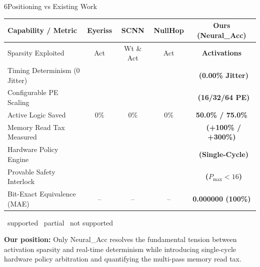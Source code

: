 \documentclass{article}
\newcommand{\bodysize}{\fontsize{20}{27}\selectfont}
\newcommand{\smallsize}{\fontsize{16}{21}\selectfont}
\newcommand{\yes}{{\color{iitgreen}\ding{51}}}
\newcommand{\no}{{\color{iitmaroon}\ding{55}}}
\newcommand{\partly}{{\color{iitgray}$\sim$}}
\begin{document}
\begin{minipage}[t]{0.488\textwidth}\vspace{0pt}
\begin{posterblock}[equal height group=rowB]{6}{Positioning vs Existing Work}
\centering
{\bodysize
\renewcommand{\arraystretch}{1.2}
\begin{tabular}{@{}lcccc@{}}
  \toprule
  \textbf{Capability / Metric} & \textbf{Eyeriss} & \textbf{SCNN} & \textbf{NullHop} & \textbf{Ours (Neural\_Acc)} \\
  \midrule
  Sparsity Exploited          & Act & Wt \& Act & Act & \textbf{Activations} \\
  Timing Determinism (0 Jitter)& \yes & \no & \no & \textbf{\yes\ (0.00\% Jitter)} \\
  Configurable PE Scaling     & \no  & \no & \no & \textbf{\yes\ (16/32/64 PE)} \\
  Active Logic Saved          & 0\%  & 0\% & 0\% & \textbf{50.0\% / 75.0\%} \\
  Memory Read Tax Measured    & \no  & \no & \no & \textbf{\yes\ (+100\% / +300\%)} \\
  Hardware Policy Engine      & \no  & \no & \no & \textbf{\yes\ (Single-Cycle)} \\
  Provable Safety Interlock   & \no  & \no & \no & \textbf{\yes\ ($P_{\max}<16$)} \\
  Bit-Exact Equivalence (MAE) & --   & --  & --  & \textbf{0.000000 (100\%)} \\
  \bottomrule
\end{tabular}\par}
\vspace{0.2em}
{\smallsize\color{iitgray}\yes\ supported \quad \partly\ partial \quad \no\ not supported\par}
\raggedright
\vspace{0.3em}
\textbf{Our position:} Only Neural\_Acc resolves the fundamental tension between activation sparsity and real-time determinism while introducing single-cycle hardware policy arbitration and quantifying the multi-pass memory read tax.
\end{posterblock}
\end{minipage}
\end{document}
